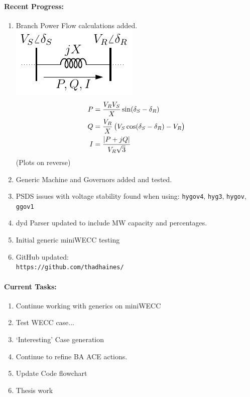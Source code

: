\documentclass[12pt]{article}
\begin{document}
\begin{multicols}{2}
\raggedright
	\paragraph{Recent Progress:}
	\begin{enumerate}
\itemsep0em 
		\item Branch Power Flow calculations added. \\
\includegraphics[width=\linewidth]{../../models/2bus/2bus}
\begin{align}
P &= \dfrac{V_R V_S}{X} \sin(\delta_S - \delta_R)\\
Q &= \dfrac{V_R}{X} \left(V_S\cos(\delta_S - \delta_R)-V_R\right)\\
I &= \dfrac{\abs{P + jQ}}{V_R\sqrt{3}}
\end{align}
(Plots on reverse)
		\item Generic Machine and Governors added and tested.
		\item PSDS issues with voltage stability found when using: 
\verb|hygov4|, 
\verb|hyg3|, 
\verb|hygov|, 
\verb|ggov1|
		\item dyd Parser updated to include MW capacity and percentages.
		\item Initial generic miniWECC testing

		\item GitHub updated:\\
		\verb|https://github.com/thadhaines/|
		
	\end{enumerate}
\paragraph{Current Tasks:}
	\begin{enumerate}
		\itemsep0em 
		\item Continue working with generics on miniWECC
		\item Test WECC case...
		\item `Interesting' Case generation
		\item Continue to refine BA ACE actions.
		\item Update Code flowchart%
		\item Thesis work 
		

\end{enumerate}
\end{multicols}
\end{document}
